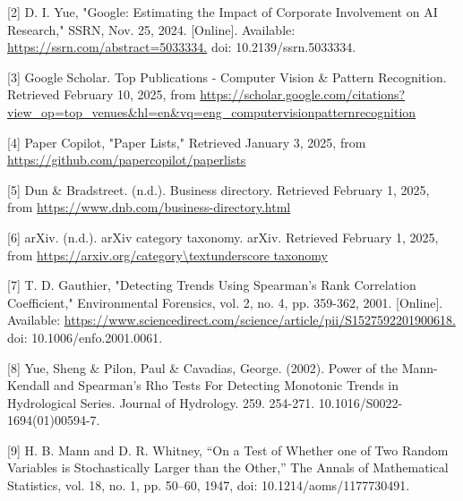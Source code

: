\documentclass{article}
\begin{document}
[2] D. I. Yue, "Google: Estimating the Impact of Corporate Involvement on AI Research," SSRN, Nov. 25, 2024. [Online]. Available: \url{https://ssrn.com/abstract=5033334.} doi: 10.2139/ssrn.5033334.

[3] Google Scholar. Top Publications - Computer Vision & Pattern Recognition. Retrieved February 10, 2025, from \url{https://scholar.google.com/citations?view_op=top_venues&hl=en&vq=eng_computervisionpatternrecognition}

[4] Paper Copilot, "Paper Lists," Retrieved January 3, 2025, from \url{https://github.com/papercopilot/paperlists}

[5] Dun \& Bradstreet. (n.d.). Business directory. Retrieved February 1, 2025, from \url{https://www.dnb.com/business-directory.html}

[6] arXiv. (n.d.). arXiv category taxonomy. arXiv. Retrieved February 1, 2025, from \url{https://arxiv.org/category\textunderscore taxonomy}

[7] T. D. Gauthier, "Detecting Trends Using Spearman's Rank Correlation Coefficient," Environmental Forensics, vol. 2, no. 4, pp. 359-362, 2001. [Online]. Available: \url{https://www.sciencedirect.com/science/article/pii/S1527592201900618.} doi: 10.1006/enfo.2001.0061.

[8] Yue, Sheng \& Pilon, Paul \& Cavadias, George. (2002). Power of the Mann-Kendall and Spearman's Rho Tests For Detecting Monotonic Trends in Hydrological Series. Journal of Hydrology. 259. 254-271. 10.1016/S0022-1694(01)00594-7. 

[9] H. B. Mann and D. R. Whitney, “On a Test of Whether one of Two Random Variables is Stochastically Larger than the Other,” The Annals of Mathematical Statistics, vol. 18, no. 1, pp. 50–60, 1947, doi: 10.1214/aoms/1177730491.
\end{document}
